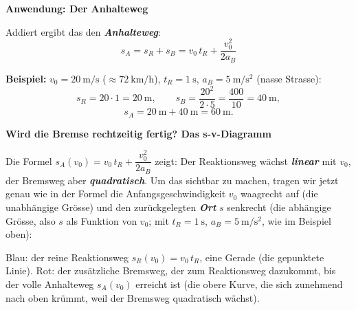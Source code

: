 \documentclass[addpoints,11pt,a4paper]{exam}
\newenvironment{theoriebox}[1][Theorie]{%
  \par\addvspace{10pt}\noindent\textbf{#1}\par\smallskip\noindent
}{%
  \par\addvspace{10pt}
}
\begin{document}
\begin{theoriebox}[Anwendung: Der Anhalteweg]
Addiert ergibt das den \textbf{\emph{Anhalteweg}}:
\[
  \boxed{s_A = s_R + s_B = v_0\,t_R + \frac{v_0^2}{2a_B}}
\]

\textbf{Beispiel:} $v_0=\SI{20}{\meter\per\second}$
($\approx\SI{72}{\kilo\meter\per\hour}$), $t_R=\SI{1}{\second}$,
$a_B=\SI{5}{\meter\per\second\squared}$ (nasse Strasse):
\[
  s_R = 20\cdot1=\SI{20}{\meter}, \qquad
  s_B = \frac{20^2}{2\cdot5} = \frac{400}{10}=\SI{40}{\meter},
\]
\[
  s_A = \SI{20}{\meter}+\SI{40}{\meter} = \SI{60}{\meter}.
\]
\end{theoriebox}

\begin{theoriebox}[Wird die Bremse rechtzeitig fertig? Das s-v-Diagramm]
Die Formel $s_A(v_0)=v_0\,t_R+\dfrac{v_0^2}{2a_B}$ zeigt: Der
Reaktionsweg wächst \textbf{\emph{linear}} mit $v_0$, der Bremsweg aber
\textbf{\emph{quadratisch}}. Um das sichtbar zu machen, tragen wir jetzt
genau wie in der Formel die Anfangsgeschwindigkeit $v_0$ waagrecht auf
(die unabhängige Grösse) und den zurückgelegten \textbf{\emph{Ort}} $s$
senkrecht (die abhängige Grösse, also $s$ als Funktion von $v_0$; mit
$t_R=\SI{1}{\second}$, $a_B=\SI{5}{\meter\per\second\squared}$, wie im
Beispiel oben):

\begin{center}
\end{center}

Blau: der reine Reaktionsweg $s_R(v_0)=v_0\,t_R$, eine Gerade (die
gepunktete Linie). Rot: der zusätzliche Bremsweg, der zum Reaktionsweg
dazukommt, bis der volle Anhalteweg $s_A(v_0)$ erreicht ist (die obere
Kurve, die sich zunehmend nach oben krümmt, weil der Bremsweg
quadratisch wächst).


\end{theoriebox}
\end{document}
